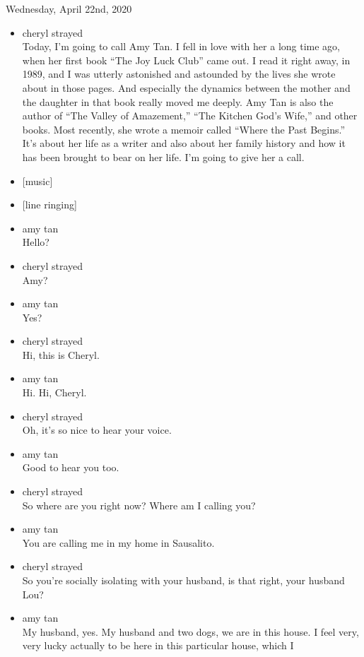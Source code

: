 Wednesday, April 22nd, 2020

\begin{itemize}
\item
  cheryl strayed\\
  Today, I'm going to call Amy Tan. I fell in love with her a long time
  ago, when her first book ``The Joy Luck Club'' came out. I read it
  right away, in 1989, and I was utterly astonished and astounded by the
  lives she wrote about in those pages. And especially the dynamics
  between the mother and the daughter in that book really moved me
  deeply. Amy Tan is also the author of ``The Valley of Amazement,''
  ``The Kitchen God's Wife,'' and other books. Most recently, she wrote
  a memoir called ``Where the Past Begins.'' It's about her life as a
  writer and also about her family history and how it has been brought
  to bear on her life. I'm going to give her a call.
\item
  {[}music{]}
\item
  {[}line ringing{]}
\item
  amy tan\\
  Hello?
\item
  cheryl strayed\\
  Amy?
\item
  amy tan\\
  Yes?
\item
  cheryl strayed\\
  Hi, this is Cheryl.
\item
  amy tan\\
  Hi. Hi, Cheryl.
\item
  cheryl strayed\\
  Oh, it's so nice to hear your voice.
\item
  amy tan\\
  Good to hear you too.
\item
  cheryl strayed\\
  So where are you right now? Where am I calling you?
\item
  amy tan\\
  You are calling me in my home in Sausalito.
\item
  cheryl strayed\\
  So you're socially isolating with your husband, is that right, your
  husband Lou?
\item
  amy tan\\
  My husband, yes. My husband and two dogs, we are in this house. I feel
  very, very lucky actually to be here in this particular house, which I

\end{itemize}
